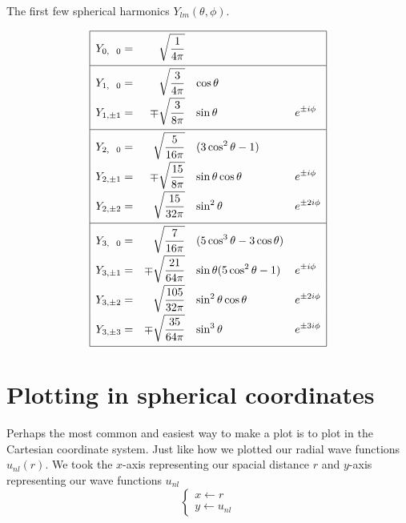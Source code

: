 \begin{table}[h!]
\caption{The first few spherical harmonics $Y_{lm}(\theta,\phi)$.}
\label{table:Ylm}
\begin{equation*}
\renewcommand\arraystretch{2.2}
\begin{array}{|>{\displaystyle}r >{\displaystyle}r >{\displaystyle}l >{\displaystyle}l|}
  \hline
  Y_{0,\phantom{\pm}0} = & \sqrt{\frac{1}{4\pi}}      &                                 &  \\[0.4em] \hline
  Y_{1,\phantom{\pm}0} = & \sqrt{\frac{3}{4\pi}}      & \cos{\theta}                    &  \\
  Y_{1,\pm1}           = & \mp\sqrt{\frac{3}{8\pi}}   & \sin{\theta}                    & e^{\pm i\phi} \\[0.4em] \hline
  Y_{2,\phantom{\pm}0} = & \sqrt{\frac{5}{16\pi}}     & (3\cos^2{\theta}-1)             &  \\
  Y_{2,\pm1}           = & \mp\sqrt{\frac{15}{8\pi}}  & \sin{\theta}\cos{\theta}        & e^{\pm i\phi} \\
  Y_{2,\pm2}           = & \sqrt{\frac{15}{32\pi}}    & \sin^2{\theta}                  & e^{\pm 2i\phi} \\[0.4em] \hline
  Y_{3,\phantom{\pm}0} = & \sqrt{\frac{7}{16\pi}}     & (5\cos^3{\theta}-3\cos{\theta}) &  \\
  Y_{3,\pm1}           = & \mp\sqrt{\frac{21}{64\pi}} & \sin{\theta}(5\cos^2{\theta}-1) & e^{\pm i\phi} \\
  Y_{3,\pm2}           = & \sqrt{\frac{105}{32\pi}}   & \sin^2{\theta}\cos{\theta}      & e^{\pm 2i\phi} \\
  Y_{3,\pm3}           = & \mp\sqrt{\frac{35}{64\pi}} & \sin^3{\theta}                  & e^{\pm 3i\phi} \\[0.4em]
  \hline
\end{array}
\end{equation*}
\end{table}

\section{Plotting in spherical coordinates}
Perhaps the most common and easiest way to make a plot is to plot in the Cartesian coordinate system.
Just like how we plotted our radial wave functions $u_{nl}(r)$. We took the $x$-axis representing
our spacial distance $r$ and $y$-axis representing our wave functions $u_{nl}$
\begin{equation} \label{eq:cartesian}
  \begin{cases}
  x \gets r \\
  y \gets u_{nl}
  \end{cases}
\end{equation}

